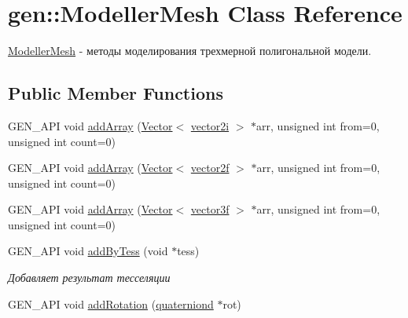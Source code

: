 \hypertarget{classgen_1_1_modeller_mesh}{\section{gen\-:\-:Modeller\-Mesh Class Reference}
\label{classgen_1_1_modeller_mesh}
}


\hyperlink{classgen_1_1_modeller_mesh}{Modeller\-Mesh} -\/ методы моделирования трехмерной полигональной модели.  


\subsection*{Public Member Functions}
\begin{DoxyCompactItemize}
\item 
G\-E\-N\-\_\-\-A\-P\-I void \hyperlink{classgen_1_1_modeller_mesh_a4c845b73d757a4e4054c1a4ae1ea24c6}{add\-Array} (\hyperlink{classbt_1_1_vector}{Vector}$<$ \hyperlink{classbt_1_1vector2i}{vector2i} $>$ $\ast$arr, unsigned int from=0, unsigned int count=0)
\item 
G\-E\-N\-\_\-\-A\-P\-I void \hyperlink{classgen_1_1_modeller_mesh_a84249a4526f804014a165d974b20aec1}{add\-Array} (\hyperlink{classbt_1_1_vector}{Vector}$<$ \hyperlink{classbt_1_1vector2f}{vector2f} $>$ $\ast$arr, unsigned int from=0, unsigned int count=0)
\item 
G\-E\-N\-\_\-\-A\-P\-I void \hyperlink{classgen_1_1_modeller_mesh_a49425074063dc69bbf94db6102d10cd7}{add\-Array} (\hyperlink{classbt_1_1_vector}{Vector}$<$ \hyperlink{classbt_1_1vector3f}{vector3f} $>$ $\ast$arr, unsigned int from=0, unsigned int count=0)
\item 
\hypertarget{classgen_1_1_modeller_mesh_a9ebfc30ad05b4eb96b0987f1ec771a2d}{G\-E\-N\-\_\-\-A\-P\-I void \hyperlink{classgen_1_1_modeller_mesh_a9ebfc30ad05b4eb96b0987f1ec771a2d}{add\-By\-Tess} (void $\ast$tess)}\label{classgen_1_1_modeller_mesh_a9ebfc30ad05b4eb96b0987f1ec771a2d}

\begin{DoxyCompactList}\small\item\em Добавляет результат тесселяции \end{DoxyCompactList}\item 
\hypertarget{classgen_1_1_modeller_mesh_a68859cdf93897bf3b7a925e7ad746386}{G\-E\-N\-\_\-\-A\-P\-I void \hyperlink{classgen_1_1_modeller_mesh_a68859cdf93897bf3b7a925e7ad746386}{add\-Rotation} (\hyperlink{classbt_1_1quaterniond}{quaterniond} $\ast$rot)}\label{classgen_1_1_modeller_mesh_a68859cdf93897bf3b7a925e7ad746386}


\end{DoxyCompactItemize}
